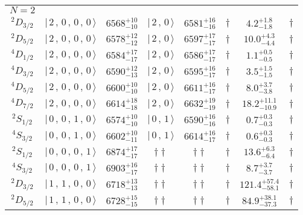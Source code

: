 \begin{tabular}{c| c c c c c c c}
\hline
 $N=2$  &  &  &  &  &  \\ 
$^{2}D_{3/2}$ & $\vert \,2\,,\,0\,,\,0\,,\,0 \,\rangle $ & $6568^{+10}_{-10}$ & $\vert \,2\,,\,0 \,\rangle$ & $6581^{+16}_{-16}$ & $\dagger$ & $4.2^{+1.8}_{-1.8}$ & $\dagger$ \\ 
$^{2}D_{5/2}$ & $\vert \,2\,,\,0\,,\,0\,,\,0 \,\rangle $ & $6578^{+12}_{-12}$ & $\vert \,2\,,\,0 \,\rangle$ & $6597^{+17}_{-17}$ & $\dagger$ & $10.0^{+4.3}_{-4.4}$ & $\dagger$ \\ 
$^{4}D_{1/2}$ & $\vert \,2\,,\,0\,,\,0\,,\,0 \,\rangle $ & $6584^{+17}_{-17}$ & $\vert \,2\,,\,0 \,\rangle$ & $6586^{+17}_{-17}$ & $\dagger$ & $1.1^{+0.5}_{-0.5}$ & $\dagger$ \\ 
$^{4}D_{3/2}$ & $\vert \,2\,,\,0\,,\,0\,,\,0 \,\rangle $ & $6590^{+12}_{-13}$ & $\vert \,2\,,\,0 \,\rangle$ & $6595^{+16}_{-17}$ & $\dagger$ & $3.5^{+1.5}_{-1.5}$ & $\dagger$ \\ 
$^{4}D_{5/2}$ & $\vert \,2\,,\,0\,,\,0\,,\,0 \,\rangle $ & $6600^{+10}_{-10}$ & $\vert \,2\,,\,0 \,\rangle$ & $6611^{+16}_{-17}$ & $\dagger$ & $8.0^{+3.7}_{-3.8}$ & $\dagger$ \\ 
$^{4}D_{7/2}$ & $\vert \,2\,,\,0\,,\,0\,,\,0 \,\rangle $ & $6614^{+18}_{-18}$ & $\vert \,2\,,\,0 \,\rangle$ & $6632^{+19}_{-19}$ & $\dagger$ & $18.2^{+11.1}_{-10.9}$ & $\dagger$ \\ 
$^{2}S_{1/2}$ & $\vert \,0\,,\,0\,,\,1\,,\,0 \,\rangle $ & $6574^{+10}_{-10}$ & $\vert \,0\,,\,1 \,\rangle$ & $6590^{+16}_{-16}$ & $\dagger$ & $0.7^{+0.3}_{-0.3}$ & $\dagger$ \\ 
$^{4}S_{3/2}$ & $\vert \,0\,,\,0\,,\,1\,,\,0 \,\rangle $ & $6602^{+10}_{-11}$ & $\vert \,0\,,\,1 \,\rangle$ & $6614^{+16}_{-17}$ & $\dagger$ & $0.6^{+0.3}_{-0.3}$ & $\dagger$ \\ 
$^{2}S_{1/2}$ & $\vert \,0\,,\,0\,,\,0\,,\,1 \,\rangle $ & $6874^{+17}_{-17}$ & $\dagger\dagger$ & $\dagger\dagger$ & $\dagger$ & $13.6^{+6.3}_{-6.4}$ & $\dagger$ \\ 
$^{4}S_{3/2}$ & $\vert \,0\,,\,0\,,\,0\,,\,1 \,\rangle $ & $6903^{+16}_{-17}$ & $\dagger\dagger$ & $\dagger\dagger$ & $\dagger$ & $8.7^{+3.7}_{-3.7}$ & $\dagger$ \\ 
$^{2}D_{3/2}$ & $\vert \,1\,,\,1\,,\,0\,,\,0 \,\rangle $ & $6718^{+13}_{-13}$ & $\dagger\dagger$ & $\dagger\dagger$ & $\dagger$ & $121.4^{+57.4}_{-58.1}$ & $\dagger$ \\ 
$^{2}D_{5/2}$ & $\vert \,1\,,\,1\,,\,0\,,\,0 \,\rangle $ & $6728^{+15}_{-15}$ & $\dagger\dagger$ & $\dagger\dagger$ & $\dagger$ & $84.9^{+38.1}_{-37.3}$ & $\dagger$ \\ 

\end{tabular}
